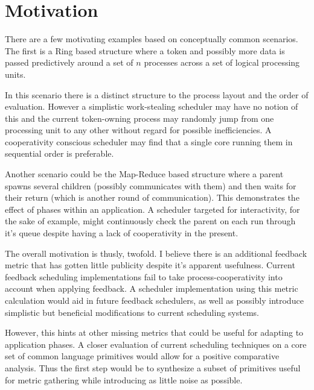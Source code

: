 \section{Motivation}
There are a few motivating examples based on conceptually common scenarios. The first is a Ring based structure 
where a token and possibly more data is passed predictively around a set of $n$ processes across a set of logical
processing units.

In this scenario there is a distinct structure to the process layout and the order of evaluation. However a 
simplistic work-stealing scheduler may have no notion of this and the current token-owning process may randomly
jump from one processing unit to any other without regard for possible inefficiencies. A cooperativity conscious
scheduler may find that a single core running them in sequential order is preferable.

Another scenario could be the Map-Reduce based structure where a parent spawns several children (possibly 
communicates with them) and then waits for their return (which is another round of communication). This 
demonstrates the effect of phases within an application. A scheduler targeted for interactivity, for the sake
of example, might continuously check the parent on each run through it's queue despite having a lack of 
cooperativity in the present.

The overall motivation is thusly, twofold. I believe there is an additional feedback metric that has gotten little
publicity despite it's apparent usefulness. Current feedback scheduling implementations fail to take 
process-cooperativity into account when applying feedback. A scheduler implementation using this metric calculation 
would aid in future feedback schedulers, as well as possibly introduce simplistic but beneficial modifications to 
current scheduling systems.

However, this hints at other missing metrics that could be useful for adapting to application phases. A closer 
evaluation of current scheduling techniques on a core set of common language primitives would allow for a positive
comparative analysis. Thus the first step would be to synthesize a subset of primitives useful for metric gathering 
while introducing as little noise as possible. 

